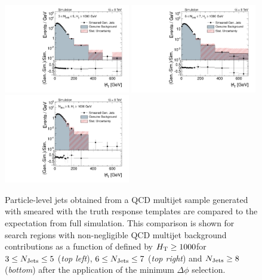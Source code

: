 \begin{figure}[!t]
  \centering

  \begin{minipage}[c]{1.\textwidth}
    \begin{center}
      \includegraphics[width=0.49\textwidth]{figures/MHT_JetBin2_HThigh_madgraph_DR53X_chs_withoutPUReweighting_SmearedGenJets_v1.pdf}%
      \includegraphics[width=0.49\textwidth]{figures/MHT_JetBin3_HThigh_madgraph_DR53X_chs_withoutPUReweighting_SmearedGenJets_v1.pdf}\\ 
      \includegraphics[width=0.49\textwidth]{figures/MHT_JetBin4_HThigh_madgraph_DR53X_chs_withoutPUReweighting_SmearedGenJets_v1.pdf}
    \end{center}
  \end{minipage}
  \caption{Particle-level jets obtained from a QCD multijet sample generated with \madgraph smeared with the truth response templates are compared to the expectation from full simulation. This comparison is shown for search regions with non-negligible QCD multijet background contributions as a function of \MHT defined by $H_{\text{T}} \ge 1000$\gev for $3 \le N_{\text{Jets}} \le 5$ (\textit{top left}), $6 \le N_{\text{Jets}} \le 7$ (\textit{top right}) and $N_{\text{Jets}} \ge 8$ (\textit{bottom}) after the application of the minimum $\Delta \phi$ selection.}
  \label{fig:qcd_rs_genjets}
\end{figure}
